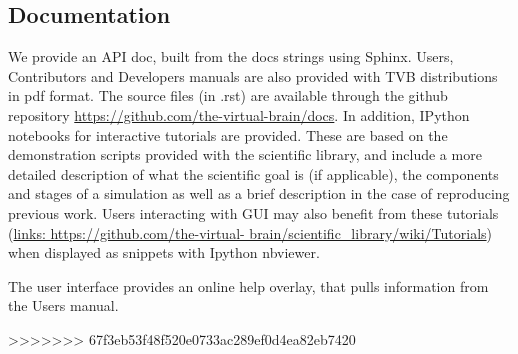 \subsection{Documentation}

We provide an API doc, built from the docs strings using Sphinx.
Users, Contributors and Developers manuals are also provided with TVB
distributions in pdf format. The source files (in .rst) are available
through the github repository \url{https://github.com/the-virtual-brain/docs}.  
In addition, IPython \cite{PerezGranger_2007} notebooks
for interactive tutorials are provided. These are based on the
demonstration scripts provided with the scientific library, and
include a more detailed description of what the scientific goal is (if
applicable), the components and stages of a simulation as well as a
brief description in the case of reproducing previous work. Users
interacting with \TVB GUI may also benefit from these tutorials
(\url{links: https://github.com/the-virtual-
brain/scientific_library/wiki/Tutorials}) when displayed as snippets
with Ipython nbviewer. 

The user interface provides an online help overlay, that pulls
information from the Users manual.

>>>>>>> 67f3eb53f48f520e0733ac289ef0d4ea82eb7420

